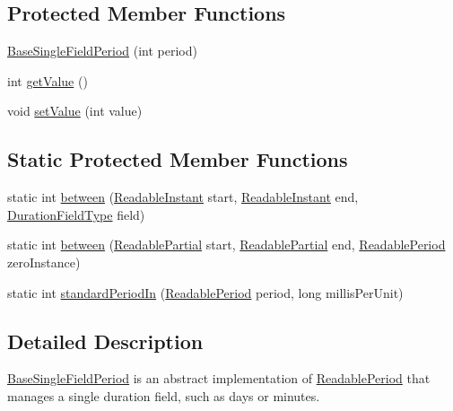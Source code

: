 \subsection*{Protected Member Functions}
\begin{DoxyCompactItemize}
\item 
\hyperlink{classorg_1_1joda_1_1time_1_1base_1_1_base_single_field_period_ad3511e16f1abcdf91794e6f15e0229d0}{Base\-Single\-Field\-Period} (int period)
\item 
int \hyperlink{classorg_1_1joda_1_1time_1_1base_1_1_base_single_field_period_ab7fe85f2ab8a78c4446226deedab05aa}{get\-Value} ()
\item 
void \hyperlink{classorg_1_1joda_1_1time_1_1base_1_1_base_single_field_period_a2ebe8706c456f18404b31b525faa6169}{set\-Value} (int value)
\end{DoxyCompactItemize}
\subsection*{Static Protected Member Functions}
\begin{DoxyCompactItemize}
\item 
static int \hyperlink{classorg_1_1joda_1_1time_1_1base_1_1_base_single_field_period_ad465d364250cedf49863577fa0c2a87a}{between} (\hyperlink{interfaceorg_1_1joda_1_1time_1_1_readable_instant}{Readable\-Instant} start, \hyperlink{interfaceorg_1_1joda_1_1time_1_1_readable_instant}{Readable\-Instant} end, \hyperlink{classorg_1_1joda_1_1time_1_1_duration_field_type}{Duration\-Field\-Type} field)
\item 
static int \hyperlink{classorg_1_1joda_1_1time_1_1base_1_1_base_single_field_period_a8c1035c20b3ae0ec83ac43a683f06cfe}{between} (\hyperlink{interfaceorg_1_1joda_1_1time_1_1_readable_partial}{Readable\-Partial} start, \hyperlink{interfaceorg_1_1joda_1_1time_1_1_readable_partial}{Readable\-Partial} end, \hyperlink{interfaceorg_1_1joda_1_1time_1_1_readable_period}{Readable\-Period} zero\-Instance)
\item 
static int \hyperlink{classorg_1_1joda_1_1time_1_1base_1_1_base_single_field_period_a047d18f3c6f8699db080f46cc98e1076}{standard\-Period\-In} (\hyperlink{interfaceorg_1_1joda_1_1time_1_1_readable_period}{Readable\-Period} period, long millis\-Per\-Unit)
\end{DoxyCompactItemize}


\subsection{Detailed Description}
\hyperlink{classorg_1_1joda_1_1time_1_1base_1_1_base_single_field_period}{Base\-Single\-Field\-Period} is an abstract implementation of \hyperlink{interfaceorg_1_1joda_1_1time_1_1_readable_period}{Readable\-Period} that manages a single duration field, such as days or minutes. 

